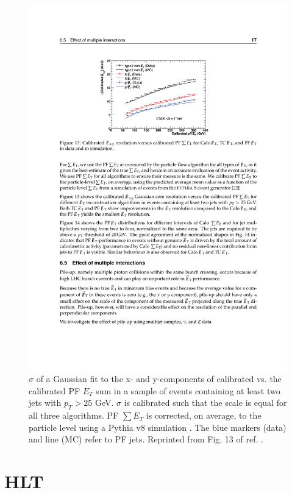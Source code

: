 \documentclass[dissertation.tex]{subfiles}
\begin{document}
\begin{figure}
	\centering
	\includegraphics[scale=1.0]{MET_resolution}
	\caption{$\sigma$ of a Gaussian fit to the x- and y-components of calibrated \MET vs. the calibrated PF $E_{T}$ sum in a sample of events containing at least two jets with $p_{T} > 25$ GeV.  $\sigma$ is calibrated such that the \MET scale is equal for all three algorithms.  PF $\sum E_{T}$ is corrected, on average, to the particle level using a Pythia v8 simulation \cite{Sjostrand2008852}.  The blue markers (data) and line (MC) refer to PF jets.  Reprinted from Fig. 13 of ref. \cite{1748-0221-6-09-P09001}.}
	\label{fig:MET_resolution}
\end{figure}

\section{HLT}
\label{sec:HLT}
\end{document}
